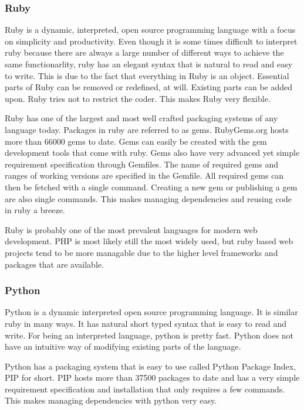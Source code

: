 \subsubsection{Ruby}
Ruby is a dynamic, interpreted, open source programming language with a focus on simplicity and productivity. Even though it is some times difficult to interpret ruby because there are always a large number of different ways to achieve the same functionarlity, ruby has an elegant syntax that is natural to read and easy to write. This is due to the fact that everything in Ruby is an object. Essential parts of Ruby can be removed or redefined, at will. Existing parts can be added upon. Ruby tries not to restrict the coder. This makes Ruby very flexible. \cite{ruby-about}

Ruby has one of the largest and most well crafted packaging systems of any language today. Packages in ruby are referred to as gems. RubyGems.org hosts more than 66000 gems to date. Gems can easily be created with the gem development tools that come with ruby. Gems also have very advanced yet simple requirement specification through Gemfiles. The name of required gems and ranges of working versions are specified in the Gemfile. All required gems can then be fetched with a single command. Creating a new gem or publishing a gem are also single commands. This makes managing dependencies and reusing code in ruby a breeze.\cite{rubygems}

Ruby is probably one of the most prevalent languages for modern web development. PHP is most likely still the most widely used, but ruby based web projects tend to be more managable due to the higher level frameworks and packages that are available.

\subsubsection{Python}
Python is a dynamic interpreted open source programming language. It is similar ruby in many ways. It has natural short typed syntax that is easy to read and write. For being an interpreted language, python is pretty fast. Python does not have an intuitive way of modifying existing parts of the language.\cite{python-about}

Python has a packaging system that is easy to use called Python Package Index, PIP for short. PIP hosts more than 37500 packages to date and has a very simple requirement specification and installation that only requires a few commands. This makes managing dependencies with python very easy.\cite{pip}

